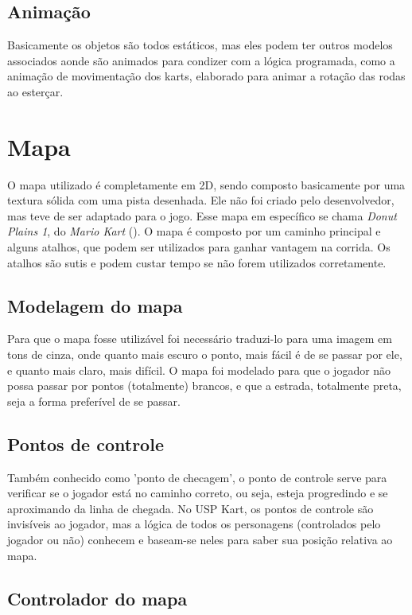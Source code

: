 \subsection{Animação}

Basicamente os objetos são todos estáticos, mas eles podem ter outros modelos associados aonde são animados para condizer com a lógica programada, como a animação de movimentação dos karts, elaborado para animar a rotação das rodas ao esterçar.

\section{Mapa}

O mapa utilizado é completamente em 2D, sendo composto basicamente por uma textura sólida com uma pista desenhada. Ele não foi criado pelo desenvolvedor, mas teve de ser adaptado para o jogo. Esse mapa em específico se chama \textit{Donut Plains 1}, do \textit{Mario Kart} (\cite{marioKart}). O mapa é composto por um caminho principal e alguns atalhos, que podem ser utilizados para ganhar vantagem na corrida. Os atalhos são sutis e podem custar tempo se não forem utilizados corretamente.

\subsection{Modelagem do mapa}

Para que o mapa fosse utilizável foi necessário traduzi-lo para uma imagem em tons de cinza, onde quanto mais escuro o ponto, mais fácil é de se passar por ele, e quanto mais claro, mais difícil. O mapa foi modelado para que o jogador não possa passar por pontos (totalmente) brancos, e que a estrada, totalmente preta, seja a forma preferível de se passar.
\subsection{Pontos de controle}

Também conhecido como 'ponto de checagem', o ponto de controle serve para verificar se o jogador está no caminho correto, ou seja, esteja progredindo e se aproximando da linha de chegada. No USP Kart, os pontos de controle são invisíveis ao jogador, mas a lógica de todos os personagens (controlados pelo jogador ou não) conhecem e baseam-se neles para saber sua posição relativa ao mapa.

\subsection{Controlador do mapa}\label{sec:controlador-do-mapa}

